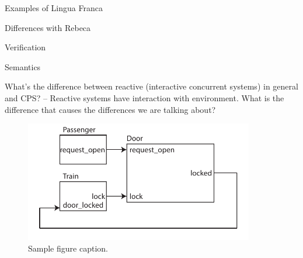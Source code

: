 \documentclass{article}
\newcommand{\Marjan}[1]{{\color{darkgreen}\textbf{} #1}}
\begin{document}
Examples of Lingua Franca

Differences with Rebeca

Verification

Semantics 

\Marjan{What's the difference between reactive (interactive concurrent systems) in general and CPS?
-- Reactive systems have interaction with environment. What is the difference that causes the differences we are talking about?}

\begin{figure}[b]
  \centering
  \includegraphics[width=10cm]{DoorControllerSimpleFixed.pdf}
  \caption{Sample figure caption.}
  \label{fig:DoorControllerSimpleFixed}
\end{figure}

  

\end{document}
